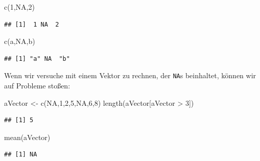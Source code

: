 \documentclass[
]{book}
\newenvironment{Shaded}{\begin{snugshade}}{\end{snugshade}}
\newcommand{\ConstantTok}[1]{\textcolor[rgb]{0.00,0.00,0.00}{#1}}
\newcommand{\DecValTok}[1]{\textcolor[rgb]{0.00,0.00,0.81}{#1}}
\newcommand{\FunctionTok}[1]{\textcolor[rgb]{0.00,0.00,0.00}{#1}}
\newcommand{\NormalTok}[1]{#1}
\newcommand{\OtherTok}[1]{\textcolor[rgb]{0.56,0.35,0.01}{#1}}
\newcommand{\SpecialCharTok}[1]{\textcolor[rgb]{0.00,0.00,0.00}{#1}}
\newcommand{\StringTok}[1]{\textcolor[rgb]{0.31,0.60,0.02}{#1}}
\begin{document}
\begin{Shaded}
\begin{Highlighting}[]
\FunctionTok{c}\NormalTok{(}\DecValTok{1}\NormalTok{,}\ConstantTok{NA}\NormalTok{,}\DecValTok{2}\NormalTok{)}
\end{Highlighting}
\end{Shaded}

\begin{verbatim}
## [1]  1 NA  2
\end{verbatim}

\begin{Shaded}
\begin{Highlighting}[]
\FunctionTok{c}\NormalTok{(}\StringTok{\textquotesingle{}a\textquotesingle{}}\NormalTok{,}\ConstantTok{NA}\NormalTok{,}\StringTok{\textquotesingle{}b\textquotesingle{}}\NormalTok{)}
\end{Highlighting}
\end{Shaded}

\begin{verbatim}
## [1] "a" NA  "b"
\end{verbatim}

Wenn wir versuche mit einem Vektor zu rechnen, der \texttt{NA}s beinhaltet, können wir auf Probleme stoßen:

\begin{Shaded}
\begin{Highlighting}[]
\NormalTok{aVector }\OtherTok{\textless{}{-}} \FunctionTok{c}\NormalTok{(}\ConstantTok{NA}\NormalTok{,}\DecValTok{1}\NormalTok{,}\DecValTok{2}\NormalTok{,}\DecValTok{5}\NormalTok{,}\ConstantTok{NA}\NormalTok{,}\DecValTok{6}\NormalTok{,}\DecValTok{8}\NormalTok{)}
\FunctionTok{length}\NormalTok{(aVector[aVector }\SpecialCharTok{\textgreater{}} \DecValTok{3}\NormalTok{])}
\end{Highlighting}
\end{Shaded}

\begin{verbatim}
## [1] 5
\end{verbatim}

\begin{Shaded}
\begin{Highlighting}[]
\FunctionTok{mean}\NormalTok{(aVector)}
\end{Highlighting}
\end{Shaded}

\begin{verbatim}
## [1] NA
\end{verbatim}
\end{document}

